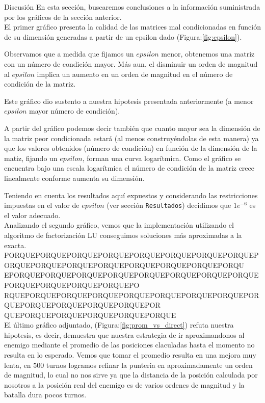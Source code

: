\begin{section}{Discusión}
	En esta sección, buscaremos conclusiones a la información suministrada por los gráficos de la sección anterior.\\
	
	El primer gráfico presenta la calidad de las matrices mal condicionadas en función de su dimensión generadas a 
	partir de un epsilon dado (Figura:\ref{fig:epsilon}).
	
	Observamos que a medida que fijamos un $epsilon$ menor, obtenemos una matriz con un número de condición mayor. 
	Más aun, el disminuir un orden de magnitud al $epsilon$ implica un aumento en un orden de magnitud en el número
	 de condición de la matriz.
	
	Este gráfico dio sustento a nuestra hipotesis presentada anteriormente (a menor $epsilon$ mayor número de 
	condición).
	
	A partir del gráfico podemos decir también que cuanto mayor sea la dimensión de la  matriz peor condicionada 
	estará (al menos construyéndolas de esta manera) ya que los valores obtenidos (número de condición) en función 
	de la dimensión de la matiz, fijando un $epsilon$, forman una curva logarítmica. Como el gráfico se encuentra 
	bajo una escala logarítmica el número de condición de la matriz crece linealmente conforme aumenta su dimensión.
	
	Teniendo en cuenta los resultados aquí expuestos y considerando las restricciones impuestas en el valor de 
	$epsilon$ (ver sección \texttt{Resultados}) decidimos que $1e^{-6}$ es el valor adecuado.\\
	
	Analizando el segundo gráfico, vemos que la implementación utilizando el algoritmo de factorización LU conseguimos soluciones más aproximadas a la exacta. PORQUEPORQUEPORQUEPORQUEPORQUEPORQUEPORQUEPORQUEPORQUEPORQUEPORQUEPORQUEPORQUEPORQUEPORQUEPORQU
	EPORQUEPORQUEPORQUEPORQUEPORQUEPORQUEPORQUEPORQUEPORQUEPORQUEPORQUEPORQUEPO
	RQUEPORQUEPORQUEPORQUEPORQUEPORQUEPORQUEPORQUEPORQUEPORQUEPORQUEPORQUEPORQUEPOR
	QUEPORQUEPORQUEPORQUEPORQUEPORQUE\\
	
	
	El último gráfico adjuntado, (Figura:\ref{fig:prom_vs_direct}) refuta nuestra hipotesis, es decir, demuestra que nuestra estrategia de ir aproximandonos al enemigo mediante el promedio de las posiciones claculadas hasta el momento no resulta en lo esperado. Vemos que tomar el promedio resulta en una mejora muy lenta, en $500$ turnos logramos refinar la punteria en aproximadamente un orden de magnitud, lo cual no nos sirve ya que la distancia de la posición calculada por nosotros a la posición real del enemigo es de varios ordenes de magnitud y la batalla dura pocos turnos.
	

\end{section}
